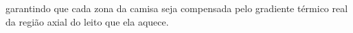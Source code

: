 garantindo que cada zona da camisa seja compensada pelo gradiente térmico real
da região axial do leito que ela aquece.\citep{luyben2014}

